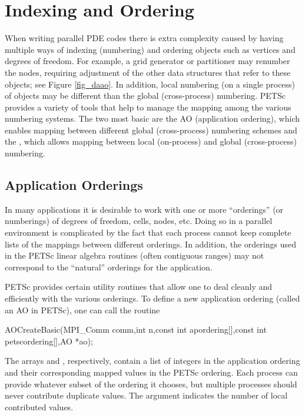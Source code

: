 \section{Indexing and Ordering}
\label{sec_indexingandordering}

  When writing parallel PDE codes there is extra complexity caused by
having multiple ways of indexing (numbering) and ordering objects such
as vertices and degrees of freedom. For example, a grid generator
or partitioner may renumber the nodes, requiring adjustment of the
other data structures that refer to these objects; see Figure
\ref{fig_daao}.  In addition, local numbering (on a single process) 
of objects may be different than the global (cross-process)
numbering. PETSc provides a variety of tools that help to manage the
mapping among the various numbering systems. The two most basic are
the AO (application ordering), which enables mapping between
different global (cross-process) numbering schemes and the , which allows mapping between local 
(on-process) and global (cross-process) numbering.

\subsection{Application Orderings}
\label{sec_ao}
 

In many applications it is desirable to work with one or more
``orderings'' (or numberings) of degrees of freedom, cells, nodes,
etc.   Doing so in a parallel environment is
complicated by the fact that each process cannot keep complete lists
of the mappings between different orderings. In addition, the
orderings used in the PETSc linear algebra routines (often contiguous 
ranges) may not correspond to the ``natural'' orderings for the application.

PETSc provides certain utility routines that allow one to deal cleanly
and efficiently with the various orderings. To define a new application ordering
(called an AO in PETSc), one can call the routine 
\begin{tabbing}
  AOCreateBasic(MPI\_Comm comm,int n,const int apordering[],const int petscordering[],AO *ao);
\end{tabbing}
The  
arrays  and , respectively, contain a list of integers
in the application ordering and their corresponding mapped values in the PETSc 
ordering. Each process can provide whatever subset of the ordering it 
chooses, but multiple processes should never contribute duplicate values. 
The argument  indicates the number of local contributed values.

